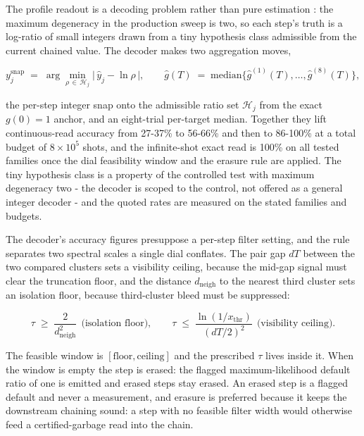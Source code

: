 The profile readout is a decoding problem rather than pure estimation \cite{hua1990pencil,kay1993estimation}: the maximum degeneracy in the production sweep is two, so each step's truth is a log-ratio of small integers drawn from a tiny hypothesis class admissible from the current chained value. The decoder makes two aggregation moves,
\begin{widetext}
\[
y_j^{\mathrm{snap}} \;=\; \arg\min_{\rho \,\in\, \mathcal{H}_j} \bigl|\, \hat{y}_j - \ln\rho \,\bigr|, \qquad \hat{g}(T) \;=\; \mathrm{median}\bigl\{ \hat{g}^{(1)}(T), \dots, \hat{g}^{(8)}(T) \bigr\},
\]
\end{widetext}
the per-step integer snap onto the admissible ratio set $\mathcal{H}_j$ from the exact $g(0) = 1$ anchor, and an eight-trial per-target median. Together they lift continuous-read accuracy from 27-37\% to 56-66\% and then to 86-100\% at a total budget of $8 \times 10^5$ shots, and the infinite-shot exact read is 100\% on all tested families once the dial feasibility window and the erasure rule are applied. The tiny hypothesis class is a property of the controlled test with maximum degeneracy two - the decoder is scoped to the control, not offered as a general integer decoder - and the quoted rates are measured on the stated families and budgets.

The decoder's accuracy figures presuppose a per-step filter setting, and the rule separates two spectral scales a single dial conflates. The pair gap $dT$ between the two compared clusters sets a visibility ceiling, because the mid-gap signal must clear the truncation floor, and the distance $d_{\mathrm{neigh}}$ to the nearest third cluster sets an isolation floor, because third-cluster bleed must be suppressed:
\begin{widetext}
\[
\tau \;\ge\; \frac{2}{d_{\mathrm{neigh}}^{2}} \ \ \text{(isolation floor)}, \qquad \tau \;\le\; \frac{\ln(1/x_{\mathrm{thr}})}{(dT/2)^{2}} \ \ \text{(visibility ceiling)}.
\]
\end{widetext}
The feasible window is $[\mathrm{floor}, \mathrm{ceiling}]$ and the prescribed $\tau$ lives inside it. When the window is empty the step is erased: the flagged maximum-likelihood default ratio of one is emitted and erased steps stay erased. An erased step is a flagged default and never a measurement, and erasure is preferred because it keeps the downstream chaining sound: a step with no feasible filter width would otherwise feed a certified-garbage read into the chain.

